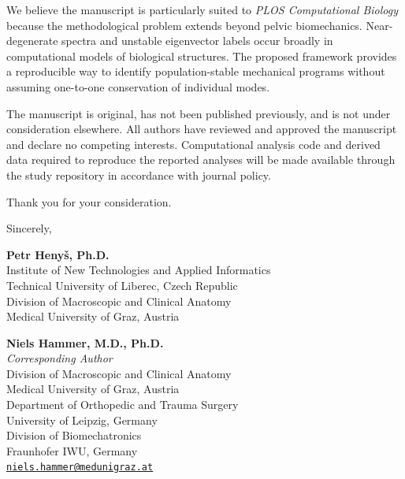 \documentclass[10pt,a4paper]{article}
\begin{document}
We believe the manuscript is particularly suited to \textit{PLOS Computational Biology} because the methodological problem extends beyond pelvic biomechanics. Near-degenerate spectra and unstable eigenvector labels occur broadly in computational models of biological structures. The proposed framework provides a reproducible way to identify population-stable mechanical programs without assuming one-to-one conservation of individual modes.

The manuscript is original, has not been published previously, and is not under consideration elsewhere. All authors have reviewed and approved the manuscript and declare no competing interests. Computational analysis code and derived data required to reproduce the reported analyses will be made available through the study repository in accordance with journal policy.

Thank you for your consideration.

\vspace{0.8em}

Sincerely,

\vspace{1.0em}

\noindent
\begin{minipage}[t]{0.50\textwidth}
\textbf{Petr Henyš, Ph.D.}\\
{\small
Institute of New Technologies and Applied Informatics\\
Technical University of Liberec, Czech Republic\\[0.25em]
Division of Macroscopic and Clinical Anatomy\\
Medical University of Graz, Austria}
\end{minipage}
\hfill
\begin{minipage}[t]{0.47\textwidth}
\textbf{Niels Hammer, M.D., Ph.D.}\\
{\small\textit{Corresponding Author}\\[0.1em]
Division of Macroscopic and Clinical Anatomy\\
Medical University of Graz, Austria\\[0.25em]
Department of Orthopedic and Trauma Surgery\\
University of Leipzig, Germany\\[0.25em]
Division of Biomechatronics\\
Fraunhofer IWU, Germany\\[0.25em]
\href{mailto:niels.hammer@medunigraz.at}{\texttt{niels.hammer@medunigraz.at}}}
\end{minipage}
\end{document}
